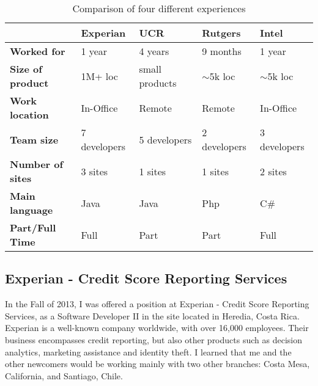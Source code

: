 \documentclass[12pt, letterpaper]{article}
\begin{document}
\begin{table}[] 
\centering
\caption{Comparison of four different experiences}
\label{comparisonTable}
\begin{tabular}{lllll}
\hline
                         & \textbf{Experian}      & \textbf{UCR}   & \textbf{Rutgers} & \textbf{Intel} \\ \hline
                         
\textbf{Worked for}      & 1 year                 & 4 years        & 9 months         & 1 year         \\ 
\textbf{Size of product} & 1M+ loc                & small products & $\sim$5k loc     & $\sim$5k loc   \\ 
\textbf{Work location}   & In-Office              & Remote         & Remote           & In-Office      \\ 
\textbf{Team size}       & 7 developers           & 5 developers   & 2 developers     & 3 developers   \\ 
\textbf{Number of sites} & 3 sites                & 1 sites        & 1 sites          & 2 sites        \\ 
\textbf{Main language}   & Java                   & Java           & Php              & C\#            \\ 
\textbf{Part/Full Time}  & Full                   & Part           & Part             & Full           \\ \hline
\end{tabular}
\end{table}

\subsection{Experian - Credit Score Reporting Services}
In the Fall of 2013, I was offered a position at Experian - Credit Score Reporting Services, as a Software Developer II in the site located in Heredia, Costa Rica.
Experian is a well-known company worldwide, with over 16,000
employees. Their business encompasses credit reporting, but also other products such as decision 
analytics, marketing assistance and identity theft. I learned that me and 
the other newcomers would be working mainly with two other branches: 
Costa Mesa, California, and Santiago, Chile. 
\end{document}
